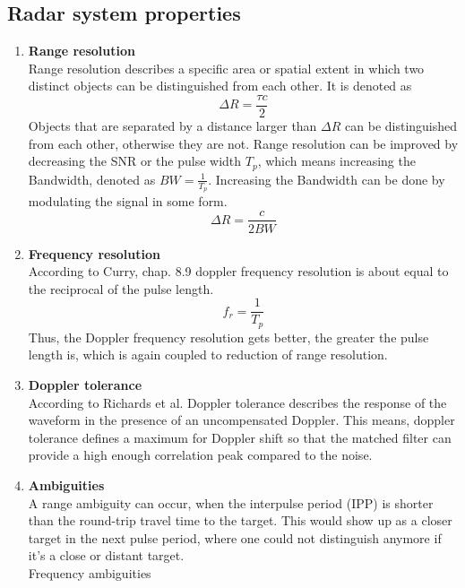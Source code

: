 \subsection{Radar system properties}
\label{subsec:props}
\begin{enumerate}
	\item \textbf{Range resolution}\\
			Range resolution describes a specific area or spatial extent in which two distinct objects can be distinguished from each other. It is denoted as
			\begin{equation}
				\Delta R = \frac{\tau c}{2}
			\end{equation}
			Objects that are separated by a distance larger than $\Delta R$ can be distinguished from each other, otherwise they are not.
			Range resolution can be improved by decreasing the SNR or the pulse width $T_p$, which means increasing the Bandwidth, denoted as $BW = \frac{1}{T_p}$. Increasing the Bandwidth can be done by modulating the signal in some form.
			\begin{equation}
				\Delta R = \frac{c}{2 BW}
			\end{equation}
	\item \textbf{Frequency resolution}\\
			According to Curry, chap. 8.9 \citep{radarSystemPerformance} doppler frequency resolution is about equal to the reciprocal of the pulse length. 
			\begin{equation}
				f_r = \frac{1}{T_p}
			\end{equation}
			Thus, the Doppler frequency resolution gets better, the greater the pulse length is, which is again coupled to reduction of range resolution.
	\item \textbf{Doppler tolerance} \\
			According to Richards et al.\citep{richards2010principles} Doppler tolerance describes the response of the waveform in the presence of an uncompensated Doppler. This means, doppler tolerance defines a maximum for Doppler shift so that the matched filter can provide a high enough correlation peak compared to the noise.
	\item \textbf{Ambiguities} \\
			A range ambiguity can occur, when the interpulse period (IPP) is shorter than the round-trip travel time to the target. This would show up as a closer target in the next pulse period, where one could not distinguish anymore if it's a close or distant target.\\
			Frequency ambiguities 
			
\end{enumerate}

